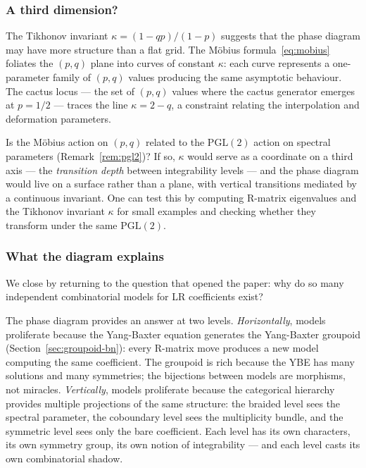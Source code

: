 \subsubsection*{A third dimension?}

The Tikhonov invariant $\kappa = (1-qp)/(1-p)$ suggests that the
phase diagram may have more structure than a flat grid.
The M\"obius formula~\eqref{eq:mobius} foliates the $(p,q)$ plane
into curves of constant $\kappa$: each curve represents a one-parameter
family of $(p,q)$ values producing the same asymptotic behaviour.  The
cactus locus --- the set of $(p,q)$ values where the cactus generator
emerges at $p = 1/2$ --- traces the line $\kappa = 2 - q$, a
constraint relating the interpolation and deformation parameters.

\begin{question}
Is the M\"obius action on $(p,q)$ related to the $\mathrm{PGL}(2)$
action on spectral parameters (Remark~\ref{rem:pgl2})?  If so, $\kappa$
would serve as a coordinate on a third axis --- the \emph{transition depth}
between integrability levels --- and the phase diagram would live on a surface
rather than a plane, with vertical transitions mediated by a continuous invariant.
One can test this by computing R-matrix eigenvalues and the Tikhonov invariant
$\kappa$ for small examples and checking whether they transform under the same
$\mathrm{PGL}(2)$.
\end{question}

\subsubsection*{What the diagram explains}

We close by returning to the question that opened the paper: why do so
many independent combinatorial models for LR coefficients exist?

The phase diagram provides an answer at two levels.  \emph{Horizontally},
models proliferate because the Yang-Baxter equation generates the
Yang-Baxter groupoid (Section~\ref{sec:groupoid-bn}): every R-matrix
move produces a new model computing the same coefficient.  The groupoid
is rich because the YBE has many solutions and many symmetries; the
bijections between models are morphisms, not miracles.
\emph{Vertically}, models proliferate because the categorical hierarchy
provides multiple projections of the same structure: the braided level
sees the spectral parameter, the coboundary level sees the multiplicity
bundle, and the symmetric level sees only the bare coefficient.  Each
level has its own characters, its own symmetry group, its own notion
of integrability --- and each level casts its own combinatorial
shadow.

